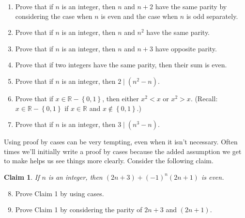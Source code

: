 \documentclass[12 pt]{article}
\newcommand{\R}{\mathbb{R}}
\newcommand{\set}[1]{\left\{#1\right\}}
\newcommand{\divides}{\! \mid \!}
\theoremstyle{definition}
\theoremstyle{plain}
\theoremstyle{mytheorem}
\newtheorem{claim}{Claim}
\theoremstyle{myexample}
\theoremstyle{mydefinition}
\begin{document}
\begin{enumerate}
\item Prove that if $n$ is an integer, then $n$ and $n+2$ have the same parity by considering the case when $n$ is even and the case when $n$ is odd separately. 

\newpage

\item Prove that if $n$ is an integer, then $n$ and $n^2$ have the same parity.

\vspace{4in}

\item Prove that if $n$ is an integer, then $n$ and $n+3$ have opposite parity.

\newpage
\item Prove that if two integers have the same parity, then their sum is even.

\vspace{4in}

\item Prove that if $n$ is an integer, then $2 \divides (n^2-n)$.
\newpage
\item Prove that if $x\in \R -\set{0,1}$, then either $x^2<x$ or $x^2>x$.  (Recall: $x \in \R - \set{0,1}$ if $x \in \R$ and $x \not\in \set{0,1}$.)
\newpage
\item Prove that if $n$ is an integer, then $3 \divides (n^3-n)$.
\end{enumerate} 
\newpage
Using proof by cases can be very tempting, even when it isn't necessary.  Often times we'll initially write a proof by cases because the added assumption we get to make helps us see things more clearly.  Consider the following claim.
\begin{claim}  If $n$ is an integer, then $(2n+3)+(-1)^n(2n+1)$ is even.
\end{claim}
\begin{enumerate} \setcounter{enumi}{7}
\item Prove Claim 1 by using cases.  
\vspace{3.5in}
\item Prove Claim 1 by considering the parity of $2n+3$ and $(2n+1)$.
\end{enumerate}
\end{document}
